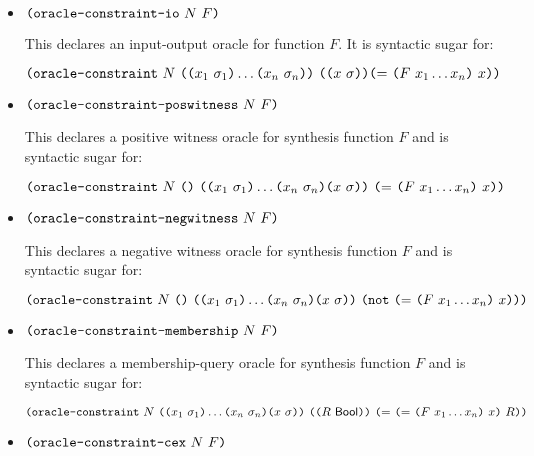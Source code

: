 \documentclass[english,a4paper,10pt]{article}
\begin{document}
\begin{itemize}
\item $\texttt{(}\texttt{oracle-constraint-io}\mbox{ }N\mbox{ } F\texttt{)}$

This declares an input-output oracle for function $F$. 
It is syntactic sugar for:


$\texttt{(}\texttt{oracle-constraint}\mbox{ } N\mbox{ }\texttt{(}\texttt{(}x_1\mbox{ }\sigma_1\texttt{)} \ldots \texttt{(}x_n\mbox{ }\sigma_n\texttt{)}\texttt{)}\mbox{ }
\texttt{(}\texttt{(}x \mbox{ }\sigma\texttt{)}\texttt{)}
\texttt{(}{\tt=}\mbox{ } \texttt{(}F \mbox{ } x_1 \ldots x_n\texttt{)}\mbox{ }  x\texttt{)}
\texttt{)}
$


\item$\texttt{(}\texttt{oracle-constraint-poswitness}\mbox{ }N\mbox{ } F\texttt{)} $

This declares a positive witness oracle for synthesis function $F$ and is syntactic sugar for:

$\texttt{(}\texttt{oracle-constraint}\mbox{ } N\mbox{ }
\texttt{(}\texttt{)}\mbox{ }
\texttt{(}\texttt{(}x_1\mbox{ }\sigma_1\texttt{)} \ldots \texttt{(}x_n\mbox{ }\sigma_n\texttt{)} \texttt{(}x \mbox{ }\sigma\texttt{)}\texttt{)}\mbox{ }
\texttt{(}{\tt=}\mbox{ } \texttt{(}F \mbox{ } x_1 \ldots x_n\texttt{)}\mbox{ }  x\texttt{)}
\texttt{)}
$

\item$\texttt{(}\texttt{oracle-constraint-negwitness}\mbox{ }N\mbox{ } F\texttt{)}$

This declares a negative witness oracle for synthesis function $F$ and  is syntactic sugar for:


$\texttt{(}\texttt{oracle-constraint}\mbox{ } N\mbox{ }
\texttt{(}\texttt{)}\mbox{ }
\texttt{(}\texttt{(}x_1\mbox{ }\sigma_1\texttt{)} \ldots \texttt{(}x_n\mbox{ }\sigma_n\texttt{)} \texttt{(}x \mbox{ }\sigma\texttt{)}\texttt{)}\mbox{ }
\texttt{(}{\tt not} \mbox{ } \texttt{(}{\tt=} \mbox{ } \texttt{(}F \mbox{ } x_1 \ldots x_n\texttt{)}\mbox{ }  x\texttt{)}\texttt{)}\texttt{)}
$


\item$\texttt{(}\texttt{oracle-constraint-membership}\mbox{ }N\mbox{ } F\texttt{)} $

This declares a membership-query oracle for synthesis function $F$ and is syntactic sugar for:


$\paren{\constraintoraclekwd \mbox{ } N\mbox{ }
\paren{\paren{x_1\mbox{ }\sigma_1} \ldots \paren{x_n\mbox{ }\sigma_n} \paren{x \mbox{ }\sigma}}\mbox{ }
\paren{\paren{R \mbox{ } \sbool}}\mbox{ } 
%
\paren{{\tt=} \mbox{ } \paren{{\tt=}\mbox{ } \paren{F \mbox{ } x_1 \ldots x_n } \mbox{ }  x} \mbox{ } R}}
$

% 

\item$\texttt{(}\texttt{oracle-constraint-cex}\mbox{ }N\mbox{ } F\texttt{)} $


\end{itemize}
\end{document}
